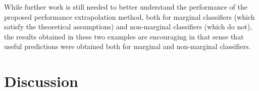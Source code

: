\documentclass[12pt]{article}
\begin{document}
While further work is still needed to better understand the
performance of the proposed performance extrapolation method, both for
marginal classifiers (which satisfy the theoretical assumptions) and
non-marginal classifiers (which do not), the results obtained in these
two examples are encouraging in that sense that useful predictions
were obtained both for marginal and non-marginal classifiers.

\section{Discussion}

\printbibliography[heading=bibintoc]
\end{document}
